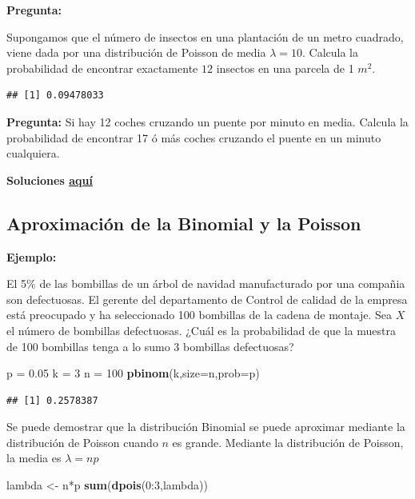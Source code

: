 \documentclass[]{article}
\newenvironment{Shaded}{\begin{snugshade}}{\end{snugshade}}
\newcommand{\KeywordTok}[1]{\textcolor[rgb]{0.13,0.29,0.53}{\textbf{{#1}}}}
\newcommand{\DataTypeTok}[1]{\textcolor[rgb]{0.13,0.29,0.53}{{#1}}}
\newcommand{\DecValTok}[1]{\textcolor[rgb]{0.00,0.00,0.81}{{#1}}}
\newcommand{\FloatTok}[1]{\textcolor[rgb]{0.00,0.00,0.81}{{#1}}}
\newcommand{\StringTok}[1]{\textcolor[rgb]{0.31,0.60,0.02}{{#1}}}
\newcommand{\NormalTok}[1]{{#1}}
\numberwithin{equation}{section}
\begin{document}
\textbf{Pregunta:}

Supongamos que el número de insectos en una plantación de un metro
cuadrado, viene dada por una distribución de Poisson de media
\(\lambda= 10\). Calcula la probabilidad de encontrar exactamente \(12\)
insectos en una parcela de 1 \(m^2\).

\begin{verbatim}
## [1] 0.09478033
\end{verbatim}

\textbf{Pregunta:} Si hay 12 coches cruzando un puente por minuto en
media. Calcula la probabilidad de encontrar 17 ó más coches cruzando el
puente en un minuto cualquiera.

\textbf{Soluciones \href{IntroSM_sol.html}{aquí}}

\subsection{Aproximación de la Binomial y la
Poisson}\label{aproximacion-de-la-binomial-y-la-poisson}

\textbf{Ejemplo:}

El 5\% de las bombillas de un árbol de navidad manufacturado por una
compañia son defectuosas. El gerente del departamento de Control de
calidad de la empresa está preocupado y ha seleccionado 100 bombillas de
la cadena de montaje. Sea \(X\) el número de bombillas defectuosas.
¿Cuál es la probabilidad de que la muestra de 100 bombillas tenga a lo
sumo 3 bombillas defectuosas?

\begin{Shaded}
\begin{Highlighting}[]
\NormalTok{p =}\StringTok{ }\FloatTok{0.05}
\NormalTok{k =}\StringTok{ }\DecValTok{3}
\NormalTok{n =}\StringTok{ }\DecValTok{100}
\KeywordTok{pbinom}\NormalTok{(k,}\DataTypeTok{size=}\NormalTok{n,}\DataTypeTok{prob=}\NormalTok{p)}
\end{Highlighting}
\end{Shaded}

\begin{verbatim}
## [1] 0.2578387
\end{verbatim}

Se puede demostrar que la distribución Binomial se puede aproximar
mediante la distribución de Poisson cuando \(n\) es grande. Mediante la
distribución de Poisson, la media es \(\lambda = np\)

\begin{Shaded}
\begin{Highlighting}[]
\NormalTok{lambda <-}\StringTok{ }\NormalTok{n*p}
\KeywordTok{sum}\NormalTok{(}\KeywordTok{dpois}\NormalTok{(}\DecValTok{0}\NormalTok{:}\DecValTok{3}\NormalTok{,lambda))}
\end{Highlighting}
\end{Shaded}
\end{document}
